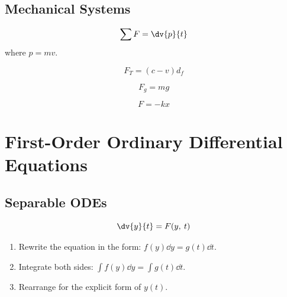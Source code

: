 \documentclass{article}
\begin{document}
\subsection{Mechanical Systems}
\begin{theorem}
    \begin{equation*}
        \sum F = \dv{p}{t}
    \end{equation*}
    where \(p = mv\).
\end{theorem}
\begin{theorem}
    \begin{equation*}
        F_T = (c - v) d_f
    \end{equation*}
\end{theorem}
\begin{theorem}
    \begin{equation*}
        F_g = mg
    \end{equation*}
\end{theorem}
\begin{theorem}
    \begin{equation*}
        F = -kx
    \end{equation*}
\end{theorem}
\section{First-Order Ordinary Differential Equations}
\subsection{Separable ODEs}
\begin{equation*}
    \dv{y}{t} = F(y,\: t)
\end{equation*}
\begin{enumerate}
    \item Rewrite the equation in the form: \(f(y)\dd{y} = g(t)\dd{t}\).
    \item Integrate both sides: \(\int f(y)\dd{y} = \int g(t)\dd{t}\).
    \item Rearrange for the explicit form of \(y(t)\).
\end{enumerate}
\end{document}
